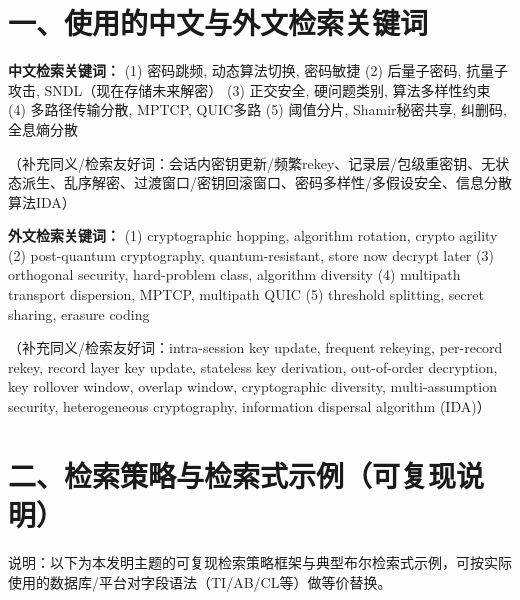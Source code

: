 \documentclass[12pt,a4paper]{article}
\begin{document}
\section*{一、使用的中文与外文检索关键词}

    \textbf{中文检索关键词：}
(1) 密码跳频, 动态算法切换, 密码敏捷
(2) 后量子密码, 抗量子攻击, SNDL（现在存储未来解密）
(3) 正交安全, 硬问题类别, 算法多样性约束
(4) 多路径传输分散, MPTCP, QUIC多路
(5) 阈值分片, Shamir秘密共享, 纠删码, 全息熵分散

（补充同义/检索友好词：会话内密钥更新/频繁rekey、记录层/包级重密钥、无状态派生、乱序解密、过渡窗口/密钥回滚窗口、密码多样性/多假设安全、信息分散算法IDA）

    \textbf{外文检索关键词：}
(1) cryptographic hopping, algorithm rotation, crypto agility
(2) post-quantum cryptography, quantum-resistant, store now decrypt later
(3) orthogonal security, hard-problem class, algorithm diversity
(4) multipath transport dispersion, MPTCP, multipath QUIC
(5) threshold splitting, secret sharing, erasure coding

（补充同义/检索友好词：intra-session key update, frequent rekeying, per-record rekey, record layer key update, stateless key derivation, out-of-order decryption, key rollover window, overlap window, cryptographic diversity, multi-assumption security, heterogeneous cryptography, information dispersal algorithm (IDA)）

\section*{二、检索策略与检索式示例（可复现说明）}

说明：以下为本发明主题的可复现检索策略框架与典型布尔检索式示例，可按实际使用的数据库/平台对字段语法（TI/AB/CL等）做等价替换。
\end{document}
